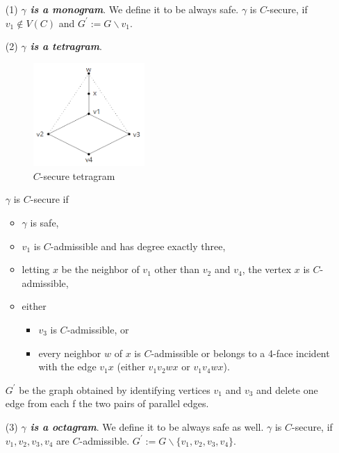 \begin{itemize}
    \item[(1)] \textit{\textbf{$\gamma$ is a monogram}}. We define it to be always safe. $\gamma$ is $C$-secure, if $v_1 \notin V(C)$ and $G^{'} := G \backslash v_1$.
    \item[(2)] \textit{\textbf{$\gamma$ is a tetragram}}. 
    \begin{figure}[H] %
    \centering %
    \includegraphics[width=0.4\textwidth]{figure/Csecuretetagram.png} 
    \caption{$C$-secure tetragram} %
    \label{figure} %
    \end{figure}
    $\gamma$ is $C$-secure if 
        \begin{itemize}
            \item $\gamma$ is safe,
            \item $v_1$ is $C$-admissible and has degree exactly three,
            \item letting $x$ be the neighbor of $v_1$ other than $v_2$ and $v_4$, the vertex $x$ is $C$-admissible,
            \item either
                \begin{itemize}
                    \item $v_3$ is $C$-admissible, or
                    \item every neighbor $w$ of $x$ is $C$-admissible or belongs to a 4-face incident with the edge $v_1x$ (either $v_1v_2wx$ or $v_1v_4wx$).
                \end{itemize}
        \end{itemize}
        $G^{'}$ be the graph obtained by identifying vertices $v_1$ and $v_3$ and delete one edge from each f the two pairs of parallel edges. 
    \item[(3)] \textit{\textbf{$\gamma$ is a octagram}}. We define it to be always safe as well. $\gamma$ is $C$-secure, if $v_1, v_2, v_3, v_4$ are $C$-admissible. $G^{'} := G \backslash \{v_1, v_2, v_3, v_4\}$.

\end{itemize}
